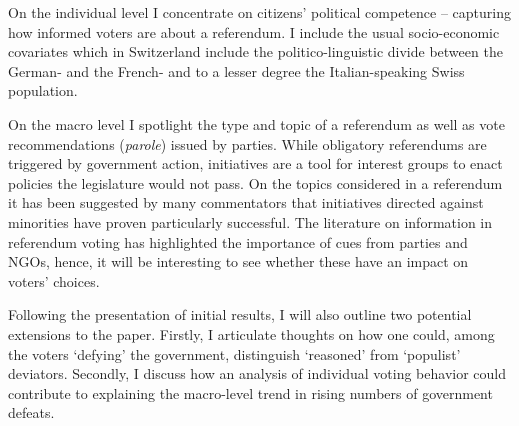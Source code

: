 \documentclass[11pt,a4paper]{article}\usepackage[]{graphicx}\usepackage[]{color}
\begin{document}
    On the individual level I concentrate on citizens' political competence -- capturing how informed voters are about a referendum. %
    I include the usual socio-economic covariates which in Switzerland include the politico-linguistic divide between the German- and the French- and to a lesser degree the Italian-speaking Swiss population. 
    
    On the macro level I spotlight the type and topic of a referendum as well as vote recommendations (\textit{parole}) issued by parties. %
    While obligatory referendums are triggered by government action, initiatives are a tool for interest groups to enact policies the legislature would not pass. 
    On the topics considered in a referendum it has been suggested by many commentators that initiatives directed against minorities have proven particularly successful. The literature on information in referendum voting has highlighted the importance of cues from parties and NGOs, hence, it will be interesting to see whether these have an impact on voters' choices.
    
    Following the presentation of initial results, I will also outline two potential extensions to the paper. Firstly, I articulate thoughts on how one could, among the voters `defying' the government, distinguish `reasoned' from `populist' deviators. Secondly, I discuss how an analysis of individual voting behavior could contribute to explaining the macro-level trend in rising numbers of government defeats. 
\end{document}
